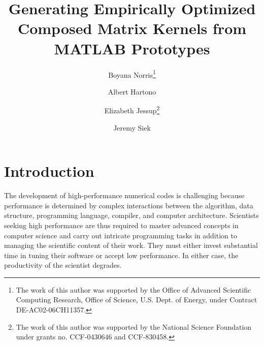 \documentclass[runningheads]{llncs}
\begin{document}
\mainmatter  %

\title{Generating Empirically Optimized Composed Matrix Kernels from MATLAB Prototypes}


\author{Boyana Norris\thanks{The work of this author was supported by the Office of Advanced Scientific Computing Research, Office of Science, U.S. Dept. of Energy, under Contract DE-AC02-06CH11357.}
  \and Albert Hartono
  \and Elizabeth Jessup\thanks{The work of this author was supported by the
  National Science Foundation under grants no. CCF-0430646 and CCF-830458.}
  \and Jeremy Siek
%
%
}

\maketitle



\section{Introduction}
\label{sec:intro}

The development of high-performance numerical codes is challenging because
performance is determined by complex interactions between the algorithm, data
structure, programming language, compiler, and computer
architecture. Scientists seeking high performance are thus required to master
advanced concepts in computer science and carry out intricate programming
tasks in addition to managing the scientific content of their work.  They
must either invest substantial time in tuning their software or accept low
performance. In either case, the productivity of the scientist degrades.
\end{document}
